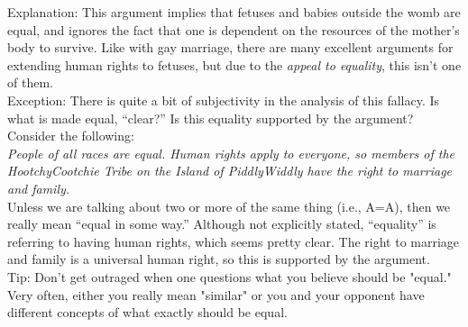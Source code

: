 \documentclass[a4paper,12pt,single,pdftex]{scrbook}
\begin{document}
    
      Explanation: This argument implies that fetuses and babies outside the womb are equal, and ignores the fact that one is dependent on the resources of the mother's body to survive. Like with gay marriage, there are many excellent arguments for extending human rights to fetuses, but due to the {\it appeal to equality}, this isn't one of them.
    \\

    
      Exception: There is quite a bit of subjectivity in the analysis of this fallacy. Is what is made equal, “clear?” Is this equality supported by the argument? Consider the following:
    \\

    
      {\em People of all races are equal. Human rights apply to everyone, so members of the HootchyCootchie Tribe on the Island of PiddlyWiddly have the right to marriage and family.}
    \\

    
      Unless we are talking about two or more of the same thing (i.e., A=A), then we really mean “equal in some way.” Although not explicitly stated, “equality” is referring to having human rights, which seems pretty clear. The right to marriage and family is a universal human right, so this is supported by the argument.
    \\

    
      Tip: Don't get outraged when one questions what you believe should be "equal." Very often, either you really mean "similar" or you and your opponent have different concepts of what exactly should be equal.
    \\
\end{document}
